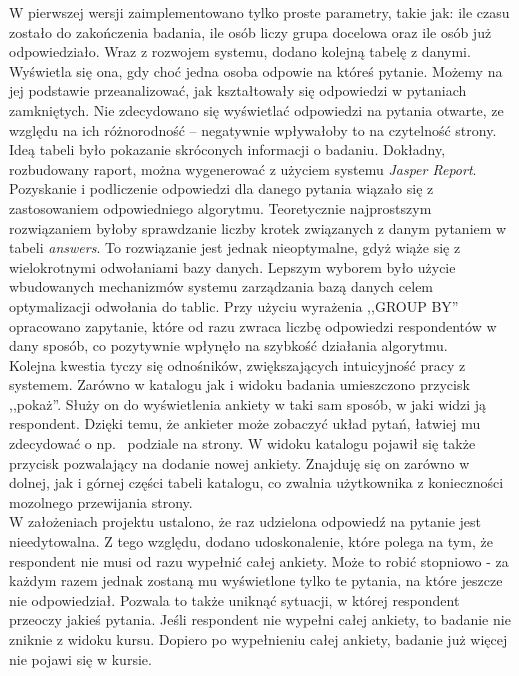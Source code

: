 W pierwszej wersji zaimplementowano tylko proste parametry, takie jak: ile czasu zostało do zakończenia badania, ile osób liczy grupa docelowa oraz ile osób już odpowiedziało. Wraz z rozwojem systemu, dodano kolejną tabelę z danymi. Wyświetla się ona, gdy choć jedna osoba odpowie na któreś pytanie. Możemy na jej podstawie przeanalizować, jak kształtowały się odpowiedzi w pytaniach zamkniętych. Nie zdecydowano się wyświetlać odpowiedzi na pytania otwarte, ze względu na ich różnorodność -- negatywnie wpływałoby to na czytelność strony. Ideą tabeli było pokazanie skróconych informacji o badaniu. Dokładny, rozbudowany raport, można wygenerować z użyciem systemu \textit{Jasper Report}. \\

Pozyskanie i podliczenie odpowiedzi dla danego pytania wiązało się z zastosowaniem odpowiedniego algorytmu. Teoretycznie najprostszym rozwiązaniem byłoby sprawdzanie liczby krotek związanych z danym pytaniem w tabeli \textit{answers}. To rozwiązanie jest jednak nieoptymalne, gdyż wiąże się z wielokrotnymi odwołaniami bazy danych. Lepszym wyborem było użycie wbudowanych mechanizmów systemu zarządzania bazą danych celem optymalizacji odwołania do tablic. Przy użyciu wyrażenia ,,GROUP BY'' opracowano zapytanie, które od razu zwraca liczbę odpowiedzi respondentów w dany sposób, co pozytywnie wpłynęło na szybkość działania algorytmu. \\

Kolejna kwestia tyczy się odnośników, zwiększających intuicyjność pracy z systemem. Zarówno w katalogu jak i widoku badania umieszczono przycisk ,,pokaż''. Służy on do wyświetlenia ankiety w taki sam sposób, w jaki widzi ją respondent. Dzięki temu, że ankieter może zobaczyć układ pytań, łatwiej mu zdecydować o np.~ podziale na strony. W widoku katalogu pojawił się także przycisk pozwalający na dodanie nowej ankiety. Znajduję się on zarówno w dolnej, jak i górnej części tabeli katalogu, co zwalnia użytkownika z konieczności mozolnego przewijania strony. \\

W założeniach projektu ustalono, że raz udzielona odpowiedź na pytanie jest nieedytowalna. Z tego względu, dodano udoskonalenie, które polega na tym, że respondent nie musi od razu wypełnić całej ankiety. Może to robić stopniowo - za każdym razem jednak zostaną mu wyświetlone tylko te pytania, na które jeszcze nie odpowiedział. Pozwala to także uniknąć sytuacji, w której respondent przeoczy jakieś pytania. Jeśli respondent nie wypełni całej ankiety, to badanie nie zniknie z widoku kursu. Dopiero po wypełnieniu całej ankiety, badanie już więcej nie pojawi się w kursie.

